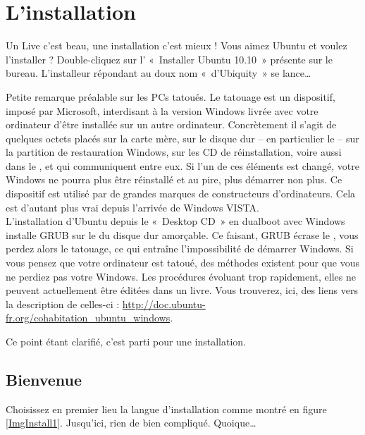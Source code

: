 \section{L'installation}
\label{RefInstall}
Un Live c'est beau, une installation c'est mieux ! Vous aimez Ubuntu et voulez l'installer ? Double-cliquez sur l' «~Installer Ubuntu 10.10~» présente sur le bureau. L'installeur répondant au doux nom «~d'Ubiquity~» se lance\ldots{}
\begin{attention}
Petite remarque préalable sur les PCs tatoués.\label{RefTatouage}
Le tatouage est un dispositif, imposé par Microsoft, interdisant à la version Windows livrée avec votre ordinateur d'être installée sur un autre ordinateur. Concrètement il s'agit de quelques octets placés sur la carte mère, sur le disque dur -- en particulier le -- sur la partition de restauration Windows, sur les CD de réinstallation, voire aussi dans le , et qui communiquent entre eux. Si l'un de ces éléments est changé, votre Windows ne pourra plus être réinstallé et au pire, plus démarrer non plus. Ce dispositif est utilisé par de grandes marques de constructeurs d'ordinateurs. Cela est d'autant plus vrai depuis l'arrivée de Windows VISTA.\\
L'installation d'Ubuntu depuis le «~Desktop CD~» en dualboot avec Windows installe GRUB sur le  du disque dur amorçable. Ce faisant, GRUB écrase le , vous perdez alors le tatouage, ce qui entraîne l'impossibilité de démarrer Windows. Si vous pensez que votre ordinateur est tatoué, des méthodes existent pour que vous ne perdiez pas votre Windows. Les procédures évoluant trop rapidement, elles ne peuvent actuellement être éditées dans un livre. Vous trouverez, ici, des liens vers la description de celles-ci : \url{http://doc.ubuntu-fr.org/cohabitation_ubuntu_windows}.
\end{attention}\par
Ce point étant clarifié, c'est parti pour une installation.
\subsection{Bienvenue}
Choisissez en premier lieu la langue d'installation comme montré en figure \ref{ImgInstall1}. Jusqu'ici, rien de bien compliqué. Quoique\ldots{}
